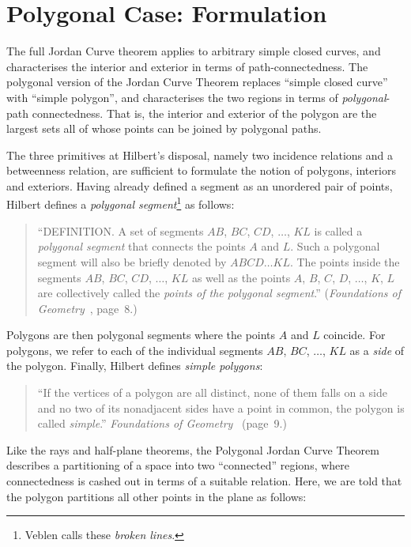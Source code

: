 \section{Polygonal Case: Formulation}\label{sec:JordanCurveExplanation}
The full Jordan Curve theorem applies to arbitrary simple closed curves, and characterises the interior and exterior in terms of path-connectedness. The polygonal version of the Jordan Curve Theorem replaces ``simple closed curve'' with ``simple polygon'', and characterises the two regions in terms of \emph{polygonal}-path connectedness. That is, the interior and exterior of the polygon are the largest sets all of whose points can be joined by polygonal paths. 

The three primitives at Hilbert's disposal, namely two incidence relations and a betweenness relation, are sufficient to formulate the notion of polygons, interiors and exteriors. Having already defined a segment as an unordered pair of points, Hilbert defines a \emph{polygonal segment}\footnote{Veblen calls these \emph{broken lines}.} as follows:

\begin{quote}
``DEFINITION. A set of segments $AB$, $BC$, $CD$, $\ldots$, $KL$ is called a \emph{polygonal segment} that connects the points $A$ and $L$. Such a polygonal segment will also be briefly denoted by $ABCD\ldots KL$. The points inside the segments $AB$, $BC$, $CD$, $\ldots$, $KL$ as well as the points $A$, $B$, $C$, $D$, $\ldots$, $K$, $L$ are collectively called the \emph{points of the polygonal segment}.'' (\emph{Foundations of Geometry}~\cite{FoundationsOfGeometry}, page~8.)  
\end{quote}

Polygons are then polygonal segments where the points $A$ and $L$ coincide. For polygons, we refer to each of the individual segments $AB$, $BC$, $\ldots$, $KL$ as a \emph{side} of the polygon. Finally, Hilbert defines \emph{simple polygons}:

\begin{quote}
``If the vertices of a polygon are all distinct, none of them falls on a side and no two of its nonadjacent sides have a point in common, the polygon is called \emph{simple}.'' \emph{Foundations of Geometry}~\cite{FoundationsOfGeometry} (page~9.)  
\end{quote}

Like the rays and half-plane theorems, the Polygonal Jordan Curve Theorem describes a partitioning of a space into two ``connected'' regions, where connectedness is cashed out in terms of a suitable relation. Here, we are told that the polygon partitions all other points in the plane as follows:

